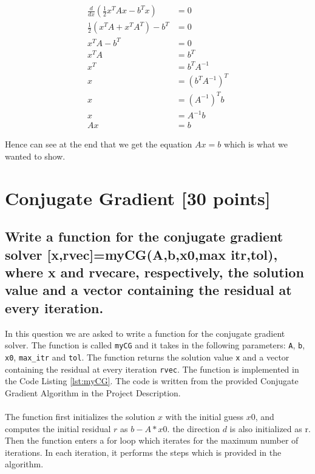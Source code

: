 \documentclass[unicode,11pt,a4paper,oneside,numbers=endperiod,openany]{scrartcl}
\begin{document}
\begin{align}
    \frac{d}{dx} \left( \frac{1}{2} x^T Ax - b^Tx \right) & = 0                           \\
    \frac{1}{2} \left( x^T A + x^T A^T \right) - b^T      & = 0                           \\
    x^T A - b^T                                           & = 0                           \\
    x^T A                                                 & = b^T                         \\
    x^T                                                   & = b^T A^{-1}                  \\
    x                                                     & = \left( b^T A^{-1} \right)^T \\
    x                                                     & = \left( A^{-1} \right)^T b   \\
    x                                                     & = A^{-1} b                    \\
    Ax                                                    & = b
\end{align}

Hence can see at the end that we get the equation $Ax = b$ which is what we wanted to show.

\section{Conjugate Gradient [30 points]}

\subsection{Write a function for the conjugate gradient solver [x,rvec]=myCG(A,b,x0,max itr,tol), where x and rvecare, respectively, the solution value and a vector containing the residual at every iteration.}

In this question we are asked to write a function for the conjugate gradient solver. The function is called \texttt{myCG} and it takes in the following parameters: \texttt{A}, \texttt{b}, \texttt{x0}, \texttt{max\_itr} and \texttt{tol}. The function returns the solution value \texttt{x} and a vector containing the residual at every iteration \texttt{rvec}. The function is implemented in the Code Listing \ref{lst:myCG}. The code is written from the provided Conjugate Gradient Algorithm in the Project Description.
\\
\\
The function first initializes the solution $x$ with the initial guess $x0$, and computes the initial residual $r$ as $b - A * x0$. the direction $d$ is also initialized as r. Then the function enters a for loop which iterates for the maximum number of iterations. In each iteration, it performs the steps which is provided in the algorithm.
\end{document}

